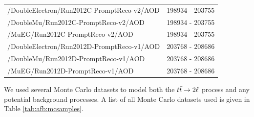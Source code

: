 \begin{table}[!ht]
\begin{center}
{\begin{tabular}{l|r}
  /DoubleElectron/Run2012C-PromptReco-v2/AOD & 198934 - 203755  \\
  /DoubleMu/Run2012C-PromptReco-v2/AOD &  198934 - 203755 \\
  /MuEG/Run2012C-PromptReco-v2/AOD &  198934 - 203755 \\

  /DoubleElectron/Run2012D-PromptReco-v1/AOD & 203768 - 208686 \\
  /DoubleMu/Run2012D-PromptReco-v1/AOD & 203768 - 208686 \\
  /MuEG/Run2012D-PromptReco-v1/AOD & 203768 - 208686 \\

\hline
\end{tabular}
}
\end{center}
\end{table}

We used several Monte Carlo datasets to model both the $t\bar{t} \rightarrow 2\ell$
process and any potential background processes. A list of all Monte
Carlo datasets used is given in Table \ref{tab:afb:mcsamples}.

